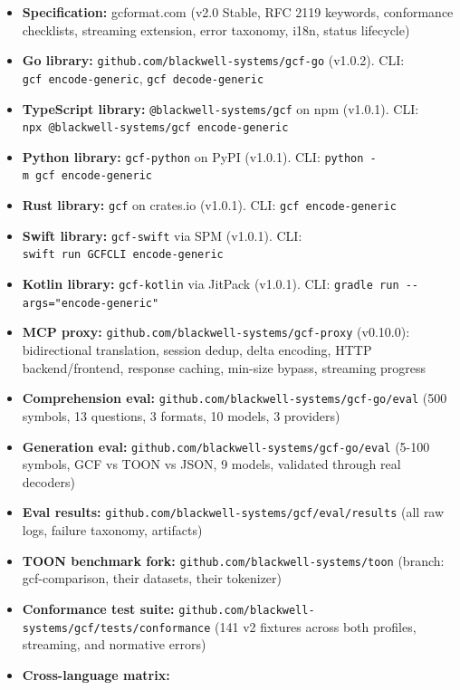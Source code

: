 \documentclass[
  11pt,
  paper=a4,
  ,captions=tableheading
]{scrartcl}
\providecommand{\tightlist}{%
  \setlength{\itemsep}{0pt}\setlength{\parskip}{0pt}}
\begin{document}
\begin{itemize}
\tightlist
\item
  \textbf{Specification:} gcformat.com (v2.0 Stable, RFC 2119 keywords,
  conformance checklists, streaming extension, error taxonomy, i18n,
  status lifecycle)
\item
  \textbf{Go library:} \texttt{github.com/blackwell-systems/gcf-go}
  (v1.0.2). CLI: \texttt{gcf\ encode-generic},
  \texttt{gcf\ decode-generic}
\item
  \textbf{TypeScript library:} \texttt{@blackwell-systems/gcf} on npm
  (v1.0.1). CLI: \texttt{npx\ @blackwell-systems/gcf\ encode-generic}
\item
  \textbf{Python library:} \texttt{gcf-python} on PyPI (v1.0.1). CLI:
  \texttt{python\ -m\ gcf\ encode-generic}
\item
  \textbf{Rust library:} \texttt{gcf} on crates.io (v1.0.1). CLI:
  \texttt{gcf\ encode-generic}
\item
  \textbf{Swift library:} \texttt{gcf-swift} via SPM (v1.0.1). CLI:
  \texttt{swift\ run\ GCFCLI\ encode-generic}
\item
  \textbf{Kotlin library:} \texttt{gcf-kotlin} via JitPack (v1.0.1).
  CLI: \texttt{gradle\ run\ -\/-args="encode-generic"}
\item
  \textbf{MCP proxy:} \texttt{github.com/blackwell-systems/gcf-proxy}
  (v0.10.0): bidirectional translation, session dedup, delta encoding,
  HTTP backend/frontend, response caching, min-size bypass, streaming
  progress
\item
  \textbf{Comprehension eval:}
  \texttt{github.com/blackwell-systems/gcf-go/eval} (500 symbols, 13
  questions, 3 formats, 10 models, 3 providers)
\item
  \textbf{Generation eval:}
  \texttt{github.com/blackwell-systems/gcf-go/eval} (5-100 symbols, GCF
  vs TOON vs JSON, 9 models, validated through real decoders)
\item
  \textbf{Eval results:}
  \texttt{github.com/blackwell-systems/gcf/eval/results} (all raw logs,
  failure taxonomy, artifacts)
\item
  \textbf{TOON benchmark fork:}
  \texttt{github.com/blackwell-systems/toon} (branch: gcf-comparison,
  their datasets, their tokenizer)
\item
  \textbf{Conformance test suite:}
  \texttt{github.com/blackwell-systems/gcf/tests/conformance} (141 v2
  fixtures across both profiles, streaming, and normative errors)
\item
  \textbf{Cross-language matrix:}

\end{itemize}
\end{document}
